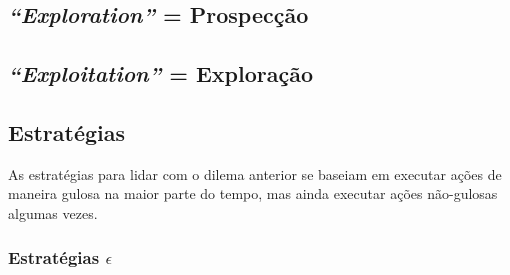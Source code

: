 \documentclass{article}
\begin{document}
        \subsection{\textit{``Exploration''} = Prospecção}
        
        \subsection{\textit{``Exploitation''} = Exploração}
    
    \subsection{Estratégias}
    
        As estratégias para lidar com o dilema anterior se baseiam em executar ações de maneira gulosa na maior parte do tempo, mas ainda executar ações não-gulosas algumas vezes.
    
        \subsubsection{Estratégias $\epsilon$}
        
\end{document}
